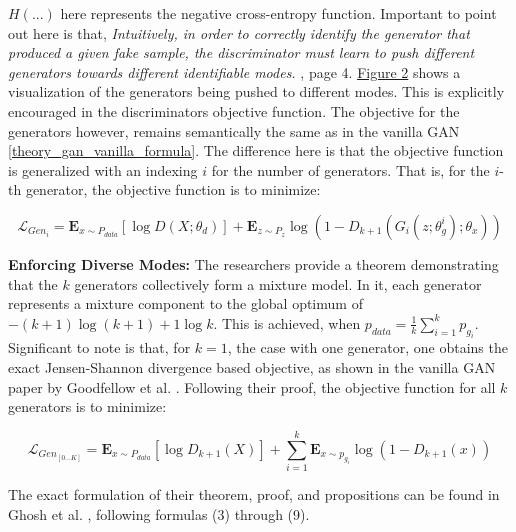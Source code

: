 \noindent
\(H(...)\) here represents the negative cross-entropy function. Important to point out here is that, \textit{Intuitively, in order to correctly identify the generator that produced a given fake sample, the discriminator must learn to push different generators towards different identifiable modes.} \cite{ghosh2018madgan}, page 4. \hyperref[fig:figure_madgan_diverse_mode_push]{Figure 2} shows a visualization of the generators being pushed to different modes. This is explicitly encouraged in the discriminators objective function. The objective for the generators however, remains semantically the same as in the vanilla GAN \ref{theory_gan_vanilla_formula}. The difference here is that the objective function is generalized with an indexing \(i\) for the number of generators. That is, for the \(i\)-th generator, the objective function is to minimize:

\begin{equation}
    \mathcal{L}_{Gen_i} = \mathbf{E}_{x \sim P_{data}} [ \log D(X; \theta_d) ] + \mathbf{E}_{z \sim P_{z}} \log (1-D_{k+1}(G_i(z; \theta_{g}^{i}); \theta_x))
\end{equation}

\noindent\textbf{Enforcing Diverse Modes:}
The researchers provide a theorem demonstrating that the \(k\) generators collectively form a mixture model. In it, each generator represents a mixture component to the global optimum of \( -(k+1)\log(k+1)+1 \log k \). This is achieved, when \(p_{data} = \frac{1}{k}\sum_{i=1}^{k} p_{g_i}\). Significant to note is that, for \(k = 1\), the case with one generator, one obtains the exact Jensen-Shannon divergence based objective, as shown in the vanilla GAN paper by Goodfellow et al. \cite{goodfellow2014generativeadversarialnetworks}. Following their proof, the objective function for all \(k\) generators is to minimize:

\begin{equation}
    \mathcal{L}_{Gen_{[0...K]}} = \mathbf{E}_{x \sim P_{data}} [ \log D_{k+1}(X) ] + \sum_{i=1}^{k}\mathbf{E}_{x \sim p_{g_i}} \log (1-D_{k+1}(x))
\end{equation}

\noindent
The exact formulation of their theorem, proof, and propositions can be found in Ghosh et al. \cite{ghosh2018madgan}, following formulas (3) through (9).

